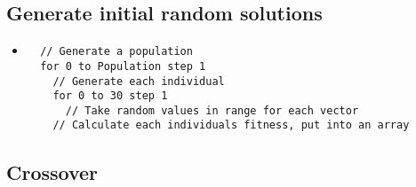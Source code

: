 \documentclass[12pt]{article}
\begin{document}
\subsection{Generate initial random solutions}
\begin{itemize}
	\item 
	\begin{lstlisting}
  // Generate a population
  for 0 to Population step 1
    // Generate each individual 
    for 0 to 30 step 1
      // Take random values in range for each vector
    // Calculate each individuals fitness, put into an array
	\end{lstlisting}
\end{itemize}

\subsection{Crossover}
\end{document}
